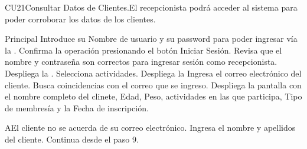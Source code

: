 

\begin{UseCase}{CU21}{Consultar Datos de Clientes.}{El recepcionista podrá acceder al sistema para poder corroborar los datos de los clientes.}
	\end{UseCase}
	\begin{UCtrayectoria}{Principal}
		\UCpaso[\UCactor] Introduce su Nombre de usuario y su password para poder ingresar vía la  \label{CU1LoginJI}.
		\UCpaso[\UCactor] Confirma la operación presionando el botón Iniciar Sesión.
		\UCpaso Revisa que el nombre y contraseña son correctos para ingresar sesión como recepcionista.
		\UCpaso Despliega la .
		\UCpaso[\UCactor]Selecciona actividades.
		\UCpaso Despliega la 
		\UCpaso[\UCactor]Ingresa el correo electrónico del cliente.
		\UCpaso Busca coincidencias con el correo que se ingreso.
		\UCpaso Despliega la pantalla con el nombre completo del clinete, Edad, Peso, actividades en las que participa, Tipo de membresía y la Fecha de inscripción.
	\end{UCtrayectoria}

		\begin{UCtrayectoriaA}{A}{El cliente no se acuerda de su correo electrónico.}
			\UCpaso[\UCactor] Ingresa el nombre y apellidos del cliente.
			\UCpaso Continua desde el paso 9.
		\end{UCtrayectoriaA}
		
